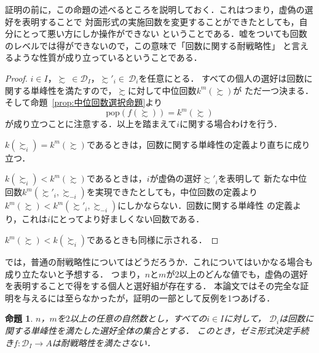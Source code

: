 \documentclass[dvipdfmx]{jsarticle}
\newtheorem{proposition}[definition]{命題}
\begin{document}
  証明の前に，この命題の述べるところを説明しておく．これはつまり，虚偽の選好を表明することで
  対面形式の実施回数を変更することができたとしても，自分にとって悪い方にしか操作ができない
  ということである．嘘をついても回数のレベルでは得ができないので，この意味で「回数に関する耐戦略性」
  と言えるような性質が成り立っているということである．

  \begin{proof}
    $i \in I$，$\succsim \ \in \mathcal{D}_I$，$\succsim'_i \in \ \mathcal{D}_i$を任意にとる．
    すべての個人の選好は回数に関する単峰性を満たすので，$\succsim$に対して中位回数$k^m(\succsim)$が
    ただ一つ決まる．そして命題~\ref{prop:中位回数選択命題}より
    \begin{equation*}
      \mathrm{pop}(f(\succsim)) = k^m(\succsim)
    \end{equation*}
    が成り立つことに注意する．以上を踏まえて$i$に関する場合わけを行う．

    $k(\succsim_i) = k^m(\succsim)$であるときは，回数に関する単峰性の定義より直ちに成り立つ．

    $k(\succsim_i) < k^m(\succsim)$であるときは，$i$が虚偽の選好$\succsim'_i$を表明して
    新たな中位回数$k^m(\succsim'_i, \succsim_{-i})$を実現できたとしても，中位回数の定義より
    $k^m(\succsim) < k^m(\succsim'_i, \succsim_{-i})$にしかならない．回数に関する単峰性
    の定義より，これは$i$にとってより好ましくない回数である．

    $k^m(\succsim) < k(\succsim_i)$であるときも同様に示される．
  \end{proof}

  では，普通の耐戦略性についてはどうだろうか．これについてはいかなる場合も成り立たないと予想する．
  つまり，$n$と$m$が2以上のどんな値でも，虚偽の選好を表明することで得をする個人と選好組が存在する．
  本論文ではその完全な証明を与えるには至らなかったが，証明の一部として反例を1つあげる．

  \begin{proposition}
    $n$，$m$を$2$以上の任意の自然数とし，すべての$i \in I$に対して，
    $\mathcal{D}_i$は回数に関する単峰性を満たした選好全体の集合とする．
    このとき，ゼミ形式決定手続き$f\colon \mathcal{D}_I \to A$は耐戦略性を満たさない．
  \end{proposition}
\end{document}

